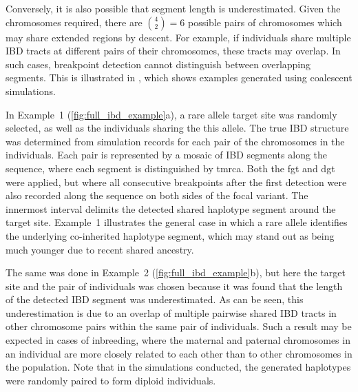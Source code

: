 %

%

Conversely, it is also possible that segment length is underestimated.
Given the  chromosomes required, there are ${{{4}\choose{2}}=6}$ possible pairs of chromosomes which may share extended regions by descent.
For example, if  individuals share multiple IBD tracts at different pairs of their chromosomes, these tracts may overlap.
In such cases, breakpoint detection cannot distinguish between overlapping segments.
This is illustrated in , which shows  examples generated using coalescent simulations.

In Example~1 (\ref{fig:full_ibd_example}{a}), a rare allele target site was randomly selected, as well as the  individuals sharing the this allele.
The true IBD structure was determined from simulation records for each pair of the  chromosomes in the  individuals.
Each pair is represented by a mosaic of IBD segments along the sequence, where each segment is distinguished by \gls{tmrca}.
Both the \gls{fgt} and \gls{dgt} were applied, but where all consecutive breakpoints after the first detection were also recorded along the sequence on both sides of the focal variant.
The innermost interval delimits the detected shared haplotype segment around the target site.
Example~1 illustrates the general case in which a rare allele identifies the underlying co-inherited haplotype segment, which may stand out as being much younger due to recent shared ancestry.

The same was done in Example~2 (\ref{fig:full_ibd_example}{b}), but here the target site and the pair of individuals was chosen because it was found that the length of the detected IBD segment was underestimated.
As can be seen, this underestimation is due to an overlap of multiple pairwise shared IBD tracts in other chromosome pairs within the same pair of individuals.
Such a result may be expected in cases of inbreeding, where the maternal and paternal chromosomes in an individual are more closely related to each other than to other chromosomes in the population.
Note that in the simulations conducted, the generated haplotypes were randomly paired to form diploid individuals.



